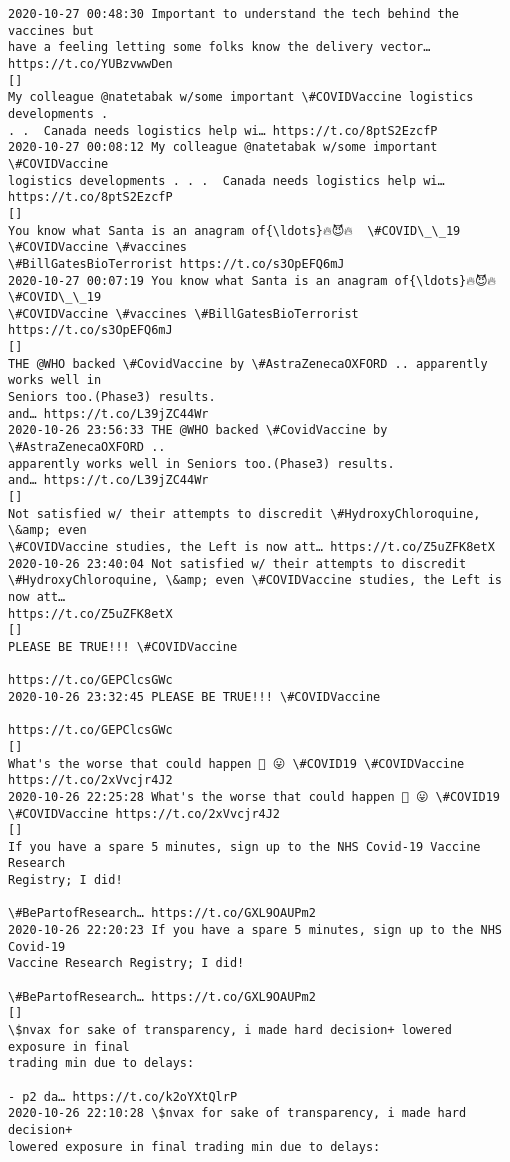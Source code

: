 \documentclass[11pt]{article}
\begin{document}
\begin{Verbatim}[commandchars=\\\{\}]
2020-10-27 00:48:30 Important to understand the tech behind the vaccines but
have a feeling letting some folks know the delivery vector…
https://t.co/YUBzvwwDen
[]
My colleague @natetabak w/some important \#COVIDVaccine logistics developments .
. .  Canada needs logistics help wi… https://t.co/8ptS2EzcfP
2020-10-27 00:08:12 My colleague @natetabak w/some important \#COVIDVaccine
logistics developments . . .  Canada needs logistics help wi…
https://t.co/8ptS2EzcfP
[]
You know what Santa is an anagram of{\ldots}🔥😈🔥  \#COVID\_\_19 \#COVIDVaccine \#vaccines
\#BillGatesBioTerrorist https://t.co/s3OpEFQ6mJ
2020-10-27 00:07:19 You know what Santa is an anagram of{\ldots}🔥😈🔥  \#COVID\_\_19
\#COVIDVaccine \#vaccines \#BillGatesBioTerrorist https://t.co/s3OpEFQ6mJ
[]
THE @WHO backed \#CovidVaccine by \#AstraZenecaOXFORD .. apparently works well in
Seniors too.(Phase3) results.
and… https://t.co/L39jZC44Wr
2020-10-26 23:56:33 THE @WHO backed \#CovidVaccine by \#AstraZenecaOXFORD ..
apparently works well in Seniors too.(Phase3) results.
and… https://t.co/L39jZC44Wr
[]
Not satisfied w/ their attempts to discredit \#HydroxyChloroquine, \&amp; even
\#COVIDVaccine studies, the Left is now att… https://t.co/Z5uZFK8etX
2020-10-26 23:40:04 Not satisfied w/ their attempts to discredit
\#HydroxyChloroquine, \&amp; even \#COVIDVaccine studies, the Left is now att…
https://t.co/Z5uZFK8etX
[]
PLEASE BE TRUE!!! \#COVIDVaccine

https://t.co/GEPClcsGWc
2020-10-26 23:32:45 PLEASE BE TRUE!!! \#COVIDVaccine

https://t.co/GEPClcsGWc
[]
What's the worse that could happen 🤔 😛 \#COVID19 \#COVIDVaccine
https://t.co/2xVvcjr4J2
2020-10-26 22:25:28 What's the worse that could happen 🤔 😛 \#COVID19
\#COVIDVaccine https://t.co/2xVvcjr4J2
[]
If you have a spare 5 minutes, sign up to the NHS Covid-19 Vaccine Research
Registry; I did!

\#BePartofResearch… https://t.co/GXL9OAUPm2
2020-10-26 22:20:23 If you have a spare 5 minutes, sign up to the NHS Covid-19
Vaccine Research Registry; I did!

\#BePartofResearch… https://t.co/GXL9OAUPm2
[]
\$nvax for sake of transparency, i made hard decision+ lowered exposure in final
trading min due to delays:

- p2 da… https://t.co/k2oYXtQlrP
2020-10-26 22:10:28 \$nvax for sake of transparency, i made hard decision+
lowered exposure in final trading min due to delays:


\end{Verbatim}
\end{document}
